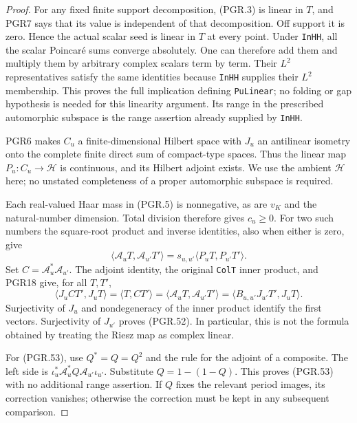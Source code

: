 \begin{proof}
For any fixed finite support decomposition, (PGR.3) is linear in
\(T\), and PGR7 says that its value is independent of that
decomposition.  Off support it is zero.  Hence the actual scalar
seed is linear in \(T\) at every point.  Under \texttt{InHH},
all the scalar Poincar\'e sums converge absolutely.  One can
therefore add them and multiply them by arbitrary complex scalars
term by term.  Their \(L^2\) representatives satisfy the same
identities because \texttt{InHH} supplies their \(L^2\)
membership.  This proves the full implication defining
\texttt{PuLinear}; no folding or gap hypothesis is needed for
this linearity argument.  Its range in the prescribed automorphic
subspace is the range assertion already supplied by \texttt{InHH}.

PGR6 makes \(C_u\) a finite-dimensional Hilbert space with
\(J_u\) an antilinear isometry onto the complete finite direct
sum of compact-type spaces.  Thus the linear map \(P_u:C_u\to
\mathcal H\) is continuous, and its Hilbert adjoint exists.
We use the ambient \(\mathcal H\) here; no unstated completeness
of a proper automorphic subspace is required.

Each real-valued Haar mass in (PGR.5) is nonnegative, as are
\(v_K\) and the natural-number dimension.  Total division
therefore gives \(c_u\geq0\).  For two such numbers the
square-root product and inverse identities, also when either is
zero, give
\[
 \langle\mathcal A_uT,\mathcal A_{u'}T'\rangle
             =s_{u,u'}\langle P_uT,P_{u'}T'\rangle.
\tag{PGR.54}
\]
Set \(C=\mathcal A_u^*\mathcal A_{u'}\).  The adjoint
identity, the original \texttt{ColT} inner product, and PGR18
give, for all \(T,T'\),
\[
 \langle J_u C T',J_uT\rangle
   =\langle T,CT'\rangle
   =\langle\mathcal A_uT,\mathcal A_{u'}T'\rangle
   =\langle B_{u,u'}J_{u'}T',J_uT\rangle.
\]
Surjectivity of \(J_u\) and nondegeneracy of the inner product
identify the first vectors.  Surjectivity of \(J_{u'}\)
proves (PGR.52).  In particular, this is not the formula obtained
by treating the Riesz map as complex linear.

For (PGR.53), use \(Q^*=Q=Q^2\) and the rule for the adjoint
of a composite.  The left side is
\(\iota_u^*\mathcal A_u^*Q\mathcal A_{u'}\iota_{u'}\).
Substitute \(Q=1-(1-Q)\).  This proves (PGR.53) with no
additional range assertion.  If \(Q\) fixes the relevant period
images, its correction vanishes; otherwise the correction must be
kept in any subsequent comparison.
\end{proof}

